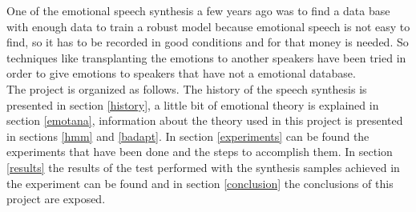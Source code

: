 One of the emotional speech synthesis a few years ago was to find a data base with enough data to train a robust model because emotional speech is not easy to find, so it has to be recorded in good conditions and for that money is needed. So techniques like transplanting the emotions to another speakers have been tried \cite{jaime transplante} in order to give emotions to speakers that have not a emotional database.\\
The project is organized as follows. The history of the speech synthesis is presented in section \ref{history}, a little bit of emotional theory is explained in section \ref{emotana}, information about the theory used in this project is presented in sections \ref{hmm} and \ref{badapt}. In section \ref{experiments} can be found the experiments that have been done and the steps to accomplish them. In section \ref{results} the results of the test performed with the synthesis samples achieved in the experiment can be found and in section \ref{conclusion} the conclusions of this project are exposed.
